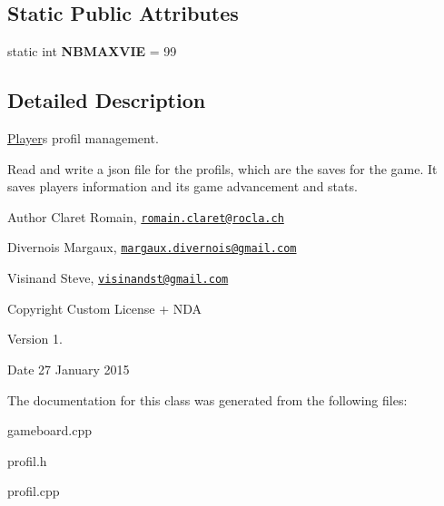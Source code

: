 \subsection*{Static Public Attributes}
\begin{DoxyCompactItemize}
\item 
\hypertarget{class_profil_a53fe2171e7e01dcaaf99da36eb8b42d6}{}static int {\bfseries N\+B\+M\+A\+X\+V\+I\+E} = 99\label{class_profil_a53fe2171e7e01dcaaf99da36eb8b42d6}

\end{DoxyCompactItemize}


\subsection{Detailed Description}
\hyperlink{class_player}{Player}\textquotesingle{}s profil management. 

Read and write a json file for the profils, which are the saves for the game. It saves player\textquotesingle{}s information and its game advancement and stats. \begin{DoxyAuthor}{Author}
Claret Romain, \href{mailto:romain.claret@rocla.ch}{\tt romain.\+claret@rocla.\+ch} 

Divernois Margaux, \href{mailto:margaux.divernois@gmail.com}{\tt margaux.\+divernois@gmail.\+com} 

Visinand Steve, \href{mailto:visinandst@gmail.com}{\tt visinandst@gmail.\+com} 
\end{DoxyAuthor}
\begin{DoxyCopyright}{Copyright}
Custom License + N\+D\+A 
\end{DoxyCopyright}
\begin{DoxyVersion}{Version}
1. 
\end{DoxyVersion}
\begin{DoxyDate}{Date}
27 January 2015 
\end{DoxyDate}


The documentation for this class was generated from the following files\+:\begin{DoxyCompactItemize}
\item 
gameboard.\+cpp\item 
profil.\+h\item 
profil.\+cpp\end{DoxyCompactItemize}
